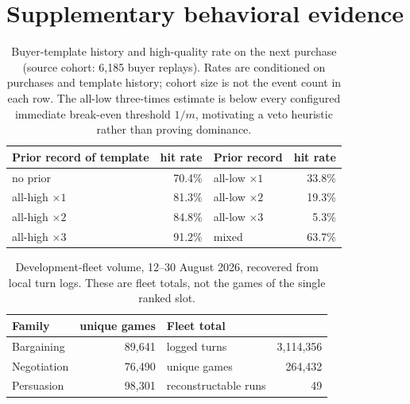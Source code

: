 \documentclass{article}
\begin{document}
\clearpage
\appendix
\section{Supplementary behavioral evidence}
\setcounter{table}{0}
\renewcommand{\theHtable}{A\arabic{table}}
\renewcommand{\thetable}{A\arabic{table}}

\begin{table}[H]
\centering\small
\caption{Buyer-template history and high-quality rate on the next purchase
(source cohort: 6,185 buyer replays). Rates are conditioned on purchases and
template history; cohort size is not the event count in each row. The all-low
three-times estimate is below every configured immediate break-even threshold
$1/m$, motivating a veto heuristic rather than proving dominance.}
\label{tab:ladder}
\begin{tabular}{@{}lrlr@{}}
\toprule
Prior record of template & hit rate & Prior record & hit rate\\
\midrule
no prior & 70.4\% & all-low $\times1$ & 33.8\%\\
all-high $\times1$ & 81.3\% & all-low $\times2$ & 19.3\%\\
all-high $\times2$ & 84.8\% & all-low $\times3$ & 5.3\%\\
all-high $\times3$ & 91.2\% & mixed & 63.7\%\\
\bottomrule
\end{tabular}
\end{table}

\begin{table}[H]
\centering\small
\caption{Development-fleet volume, 12--30 August 2026, recovered from local
turn logs. These are fleet totals, not the games of the single ranked slot.}
\label{tab:volume}
\begin{tabular}{@{}lrlr@{}}
\toprule
Family & unique games & Fleet total & \\
\midrule
Bargaining & 89,641 & logged turns & 3,114,356\\
Negotiation & 76,490 & unique games & 264,432\\
Persuasion & 98,301 & reconstructable runs & 49\\
\bottomrule
\end{tabular}
\end{table}
\end{document}
